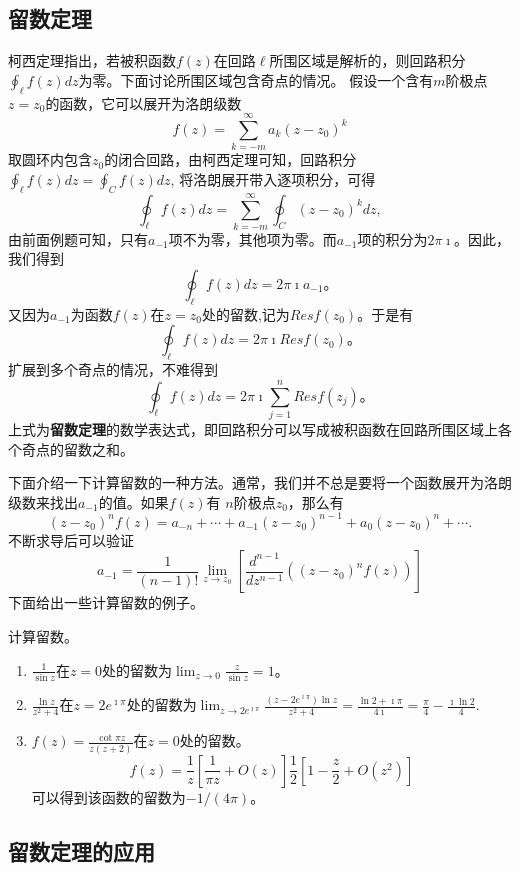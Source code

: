 \subsection{留数定理}
\label{subsec:residual_theorem}
柯西定理指出，若被积函数$f(z)$在回路$\ell$所围区域是解析的，则回路积分$\oint_\ell f(z) dz$为零。下面讨论所围区域包含奇点的情况。
假设一个含有$m$阶极点$z=z_0$的函数，它可以展开为洛朗级数
\[
  f(z) = \sum_{k = -m} ^{\infty} a_k (z - z_0)^k  
\]
取圆环内包含$z_0$的闭合回路，由柯西定理可知，回路积分$\oint_\ell f(z) dz = \oint_C f(z) dz$, 将洛朗展开带入逐项积分，可得
\[
\oint_\ell f(z) dz = \sum_{k = -m} ^{\infty} \oint_C  (z - z_0)^k dz,
\]
由前面例题可知，只有$a_{-1}$项不为零，其他项为零。而$a_{-1}$项的积分为$2\pi\imath$。因此，我们得到
\begin{equation}
    \oint_\ell f(z) dz = 2\pi \imath a_{-1} \textrm{。}
\end{equation}
又因为$a_{-1}$为函数$f(z)$在$z=z_0$处的留数,记为$Res f(z_0)$。于是有
\begin{equation}
    \oint_\ell f(z) dz = 2\pi \imath Res f(z_0) \textrm{。}
\end{equation}
扩展到多个奇点的情况，不难得到
\begin{equation}
    \oint_\ell f(z) dz = 2\pi \imath \sum_{j=1}^{n} Res f(z_j) \textrm{。}
\end{equation}
上式为\textbf{留数定理}的数学表达式，即回路积分可以写成被积函数在回路所围区域上各个奇点的留数之和。

下面介绍一下计算留数的一种方法。通常，我们并不总是要将一个函数展开为洛朗级数来找出$a_{-1}$的值。如果$f(z)$有
$n$阶极点$z_0$，那么有
\begin{equation}
    \left(z-z_0\right)^n f(z)=a_{-n}+\cdots+a_{-1}\left(z-z_0\right)^{n-1}+a_0\left(z-z_0\right)^n+\cdots .
\end{equation}
不断求导后可以验证
\begin{equation}
    a_{-1}=\frac{1}{(n-1) !} \lim _{z \rightarrow z_0}\left[\frac{d^{n-1}}{d z^{n-1}}\left(\left(z-z_0\right)^n f(z)\right)\right]
\end{equation}
下面给出一些计算留数的例子。
\begin{examplebox}{计算留数。}
    
    \begin{enumerate}
        \item $\frac{1}{\sin z}$在$z=0$处的留数为$\lim_{z\to 0} \frac{z}{\sin{z}} = 1$。
        \item $\frac{\ln{z}}{z^2 + 4}$在$z=2e^{\imath \pi}$处的留数为$\lim_{z\to 2e^{\imath \pi}} \frac{(z-2e^{\imath \pi})\ln{z} }{z^2 + 4} = 
        \frac{\ln 2 + \imath \pi}{4\imath} = \frac{\pi}{4} - \frac{\imath\ln{2}}{4}.$
        \item $f(z) = \frac{\cot{\pi z}}{z(z+2)}$在$z=0$处的留数。\\
            \[
              f(z) = \frac{1}{z} \left[\frac{1}{\pi z} + O(z) \right]\frac{1}{2} \left[1 - \frac{z}{2} + O(z^2)\right]  
            \]
            可以得到该函数的留数为$-1/(4\pi)$。
    \end{enumerate}
\end{examplebox}
\subsection{留数定理的应用}
\label{subsec:residual_theorem_applications}